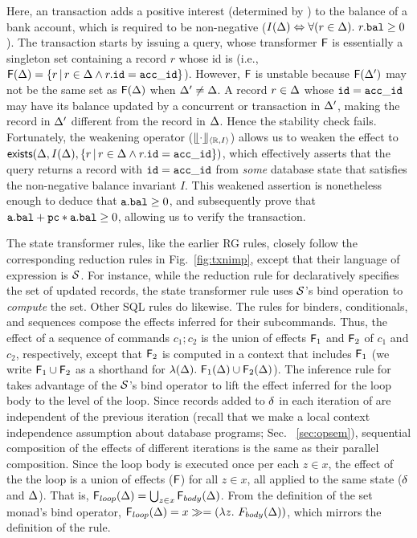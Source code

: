 Here, an  transaction adds a positive interest
(determined by ) to the balance of a bank account, which is
required to be non-negative ($I(\Delta) \Leftrightarrow
\forall(r\in\Delta).~r.{\tt bal}\ge 0$). The transaction starts by issuing
a  query, whose transformer ${\sf F}$ is essentially a singleton
set containing a record $r$ whose id is  (i.e.,
${\sf F}(\Delta) = \{r \,|\, r\in\Delta \wedge r.{\tt id} = {\tt acc\_id}\}$).
However, ${\sf F}$ is unstable because ${\sf F}(\Delta')$ may not be
the same set as ${\sf F}(\Delta)$ when $\Delta'\neq\Delta$. A record
$r\in\Delta$ whose ${\tt id}={\tt acc\_id}$ may have its balance updated by
a concurrent  or  transaction in $\Delta'$,
making the record in $\Delta'$ different from the record in $\Delta$.
Hence the stability check fails.  Fortunately, the weakening operator
($\llfloor \cdot \rrfloor_{\langle \mathbb{R},I \rangle}$) allows us to weaken the effect to
${\sf exists}(\Delta, I(\Delta), \{ r \,|\, r\in\Delta \wedge
r.{\tt id}={\tt acc\_id}\})$, which effectively asserts that the
 query returns a record with ${\tt id}={\tt acc\_id}$ from
\emph{some} database state that satisfies the non-negative balance
invariant $I$.  This weakened assertion is nonetheless enough to
deduce that ${\tt a.bal}\ge0$, and subsequently prove that ${\tt a.bal +
pc*a.bal}\ge 0$, allowing us to verify the 
transaction.

The state transformer rules, like the earlier RG rules, closely follow
the corresponding reduction rules in Fig.~\ref{fig:txnimp}, except
that their language of expression is $\mathcal{S}$. For instance, while the
reduction rule for  declaratively specifies the set of
updated records, the state transformer rule uses $\mathcal{S}$'s bind
operation to \emph{compute} the set. Other SQL rules do likewise. The
rules for  binders, conditionals, and sequences compose the
effects inferred for their subcommands. Thus, the effect of a sequence
of commands $c_1;c_2$ is the union of effects ${\sf F}_1$ and ${\sf F}_2$ of
$c_1$ and $c_2$, respectively, except that ${\sf F}_2$ is computed in a
context that includes ${\sf F}_1$ (we write ${\sf F}_1 \cup {\sf F}_2$ as a shorthand
for $\lambda(\Delta).~{\sf F}_1(\Delta) \cup {\sf F}_2(\Delta)$). The inference rule
for  takes advantage of the $\mathcal{S}$'s bind operator to lift
the effect inferred for the loop body to the level of the loop. Since
records added to $\delta$ in each iteration of  are
independent of the previous iteration (recall that we make a local
context independence assumption about database programs; Sec.
~\ref{sec:opsem}), sequential composition of the effects of different
iterations is the same as their parallel composition. Since the loop
body is executed once per each $z\in x$, the effect of the the loop is
a union of effects (${\sf F}$) for all $z\in x$, all applied to the same
state ($\delta$ and $\Delta$).  That is, ${\sf F}_{loop}(\Delta) = \bigcup_{z\in
x}{\sf F}_{body}(\Delta)$. From the definition of the set monad's bind
operator, ${\sf F}_{loop}(\Delta) = x \gg= (\lambda z.~F_{body}(\Delta))$,
which mirrors the definition of the rule.


